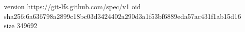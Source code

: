 version https://git-lfs.github.com/spec/v1
oid sha256:6a636798a2899c18bc03d3424402a290d3a1f53bf6889eda57ac431f1ab15d16
size 349692
